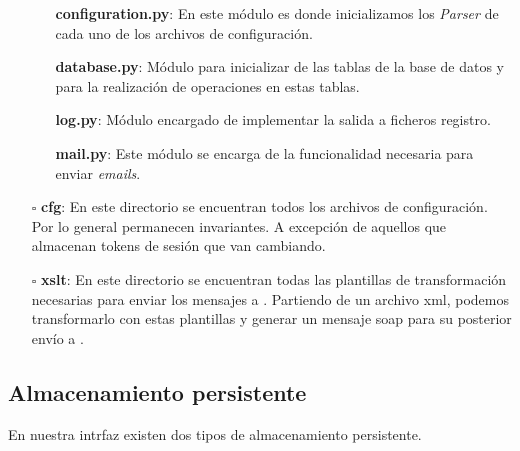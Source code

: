 \begin{itemize}
			\begin{itemize}
				\item [\textendash] \textbf{configuration.py}: En este módulo es donde inicializamos los \textit{Parser} de cada uno de los archivos de configuración.
				\item [\textendash] \textbf{database.py}: Módulo para inicializar de las tablas de la base de datos y para la realización de operaciones en estas tablas.
				\item [\textendash] \textbf{log.py}: Módulo encargado de implementar la salida a ficheros registro.
				\item [\textendash] \textbf{mail.py}: Este módulo se encarga de la funcionalidad necesaria para enviar \textit{emails}.
			\end{itemize}
			
	\item[$\square$] \textbf{cfg}: En este directorio se encuentran todos los archivos de configuración. 
	Por lo general permanecen invariantes. A excepción de aquellos que almacenan tokens de sesión que van cambiando.
	\item[$\square$] \textbf{xslt}: En este directorio se encuentran todas las plantillas de transformación necesarias para enviar los mensajes a \wday.
	Partiendo de un archivo xml, podemos transformarlo con estas plantillas y generar un mensaje \acrshort{soap} para su posterior envío a \wday.
	

\end{itemize}




\subsection{Almacenamiento persistente}

En nuestra intrfaz existen dos tipos de almacenamiento persistente. 

